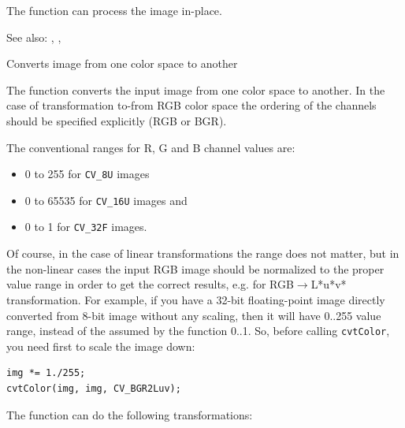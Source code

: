The function can process the image in-place.

See also: , , 


Converts image from one color space to another

\begin{description}
\end{description}

The function converts the input image from one color
space to another. In the case of transformation to-from RGB color space the ordering of the channels should be specified explicitly (RGB or BGR).

The conventional ranges for R, G and B channel values are:

\begin{itemize}
 \item 0 to 255 for \texttt{CV\_8U} images
 \item 0 to 65535 for \texttt{CV\_16U} images and
 \item 0 to 1 for \texttt{CV\_32F} images.
\end{itemize}

Of course, in the case of linear transformations the range does not matter,
but in the non-linear cases the input RGB image should be normalized to the proper value range in order to get the correct results, e.g. for RGB$\rightarrow$L*u*v* transformation. For example, if you have a 32-bit floating-point image directly converted from 8-bit image without any scaling, then it will have 0..255 value range, instead of the assumed by the function 0..1. So, before calling \texttt{cvtColor}, you need first to scale the image down:
\begin{lstlisting}
img *= 1./255;
cvtColor(img, img, CV_BGR2Luv);
\end{lstlisting}

The function can do the following transformations:

